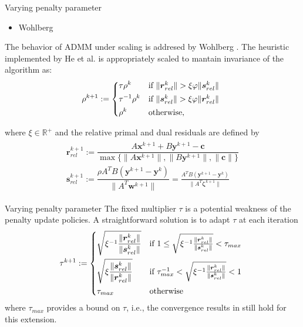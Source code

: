 \documentclass[8pt,red]{beamer}
\theoremstyle{plain}
\theoremstyle{definition}
\theoremstyle{remark}
\renewcommand{\Re}{\ensuremath{\mathbb{R}}}
\newcommand{\bi}[1]{\ensuremath{\boldsymbol{#1}}}
\begin{document}
\begin{frame}{Varying penalty parameter}
\begin{itemize}
\item Wohlberg
\end{itemize}
The behavior of ADMM under scaling is addresed by Wohlberg \citep{wohlberg2017admm}. The heuristic implemented by He et al. is appropriately scaled to mantain invariance of the algorithm as:
\begin{align}
  \rho^{k+1} := 
  \begin{dcases*}
	\tau \rho^{k}
    & if $ \| \bi{r}_{rel}^{k} \| > \xi \varphi \| \bi{s}_{rel}^{k} \|$ \\
    \tau^{-1} \rho^{k}
    & if $ \| \bi{s}_{rel}^{k} \| > \xi \varphi \| \bi{r}_{rel}^{k} \|$ \\
    \rho^{k}
    & otherwise, \\
  \end{dcases*}  
\end{align}

where $\xi \in \Re^{+}$ and the relative primal and dual residuals are defined by
\begin{align}
\begin{array}{l}
  \bi{r}_{rel}^{k+1}
  := \dfrac{A \bi{x}^{k+1} + B \bi{y}^{k+1} - \bi{c}}{\max \lbrace \|A \bi{x}^{k+1}\|,\|B \bi{y}^{k+1}\|, \|\bi{c}\|  \rbrace }  \\
  \bi{s}_{rel}^{k+1}
  := \dfrac{\rho A^{T} B \left( \bi{y}^{k+1} - \bi{y}^{k} \right)}{\|A^{T} \bi{w}^{k+1}\|}
  = \frac{A^{T} B \left( \bi{y}^{k+1} - \bi{y}^{k} \right)}{\|A^{T} \bi{\zeta}^{k+1}\|} 
\end{array}
\end{align}
\end{frame}

\begin{frame}{Varying penalty parameter}
The fixed multiplier $\tau$ is a potential weakness of the penalty update policies. A straightforward solution is to adapt $\tau$ at each iteration
\begin{align}
  \tau^{k+1} := 
  \begin{dcases*}
	\sqrt{\xi^{-1} \frac{\| \bi{r}_{rel}^{k} \|}{\| \bi{s}_{rel}^{k} \|}}
    & if $1 \leq \sqrt{\xi^{-1} \frac{\| \bi{r}_{rel}^{k} \|}{\| \bi{s}_{rel}^{k} \|}} < \tau_{max}$ \\
    \sqrt{\xi \frac{\| \bi{s}_{rel}^{k} \|}{\| \bi{r}_{rel}^{k} \|}}
    & if $\tau_{max}^{-1} < \sqrt{\xi^{-1} \frac{\| \bi{r}_{rel}^{k} \|}{\| \bi{s}_{rel}^{k} \|}} < 1$ \\
    \tau_{max}
    & otherwise \\
  \end{dcases*}  
\end{align}
where $\tau_{max}$ provides a bound on $\tau$, i.e., the convergence results in \citep{He2000} still hold for this extension.
\end{frame}
\end{document}
